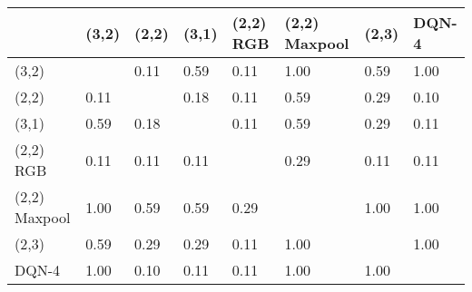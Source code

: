 \begin{tabular}{llllllll}
\hline
               & (3,2)   & (2,2)   & (3,1)   & (2,2) RGB   & (2,2) Maxpool   & (2,3)   & DQN-4   \\
\hline
 (3,2)         &         & 0.11    & 0.59    & 0.11        & 1.00            & 0.59    & 1.00    \\
 (2,2)         & 0.11    &         & 0.18    & 0.11        & 0.59            & 0.29    & 0.10    \\
 (3,1)         & 0.59    & 0.18    &         & 0.11        & 0.59            & 0.29    & 0.11    \\
 (2,2) RGB     & 0.11    & 0.11    & 0.11    &             & 0.29            & 0.11    & 0.11    \\
 (2,2) Maxpool & 1.00    & 0.59    & 0.59    & 0.29        &                 & 1.00    & 1.00    \\
 (2,3)         & 0.59    & 0.29    & 0.29    & 0.11        & 1.00            &         & 1.00    \\
 DQN-4         & 1.00    & 0.10    & 0.11    & 0.11        & 1.00            & 1.00    &         \\
\hline
\end{tabular}